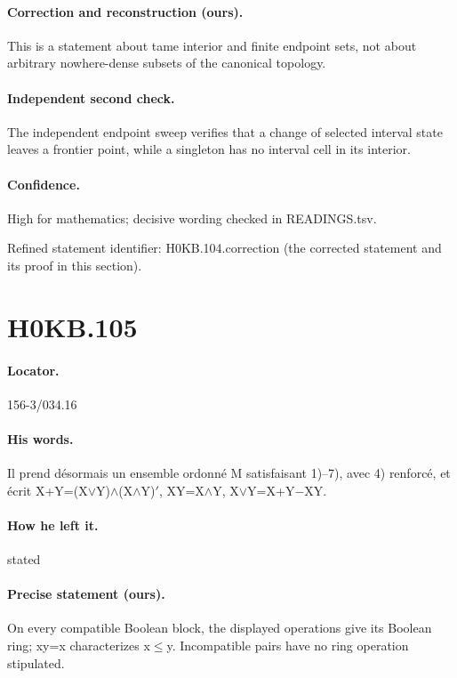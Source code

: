 \paragraph{Correction and reconstruction (ours).} This is a statement about tame interior and finite endpoint sets, not about arbitrary nowhere-dense subsets of the canonical topology.

\paragraph{Independent second check.} The independent endpoint sweep verifies that a change of selected interval state leaves a frontier point, while a singleton has no interval cell in its interior.

\paragraph{Confidence.} High for mathematics; decisive wording checked in READINGS.tsv.

\noindent Refined statement identifier: H0KB.104.correction (the corrected statement and its proof in this section).

\section*{H0KB.105}\label{statement:H0KB.105}
\paragraph{Locator.} 156-3/034.16

\paragraph{His words.} Il prend désormais un ensemble ordonné M satisfaisant 1)–7), avec 4) renforcé, et écrit X+Y=(X\ensuremath{\vee}Y)\ensuremath{\wedge}(X\ensuremath{\wedge}Y)\ensuremath{\prime}, XY=X\ensuremath{\wedge}Y, X\ensuremath{\vee}Y=X+Y\ensuremath{-}XY.

\paragraph{How he left it.} stated

\paragraph{Precise statement (ours).} On every compatible Boolean block, the displayed operations give its Boolean ring; xy=x characterizes x\ensuremath{\leq}y. Incompatible pairs have no ring operation stipulated.

